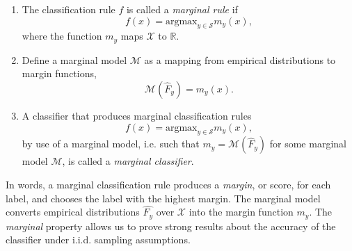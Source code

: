 \documentclass[12pt]{article}
\begin{document}
\begin{definition}
\begin{enumerate}
\item The classification rule $f$ is called a \emph{marginal rule} if 
\[
f(x) = \text{argmax}_{y \in \mathcal{S}} m_y(x),
\]
where the function $m_y$ maps $\mathcal{X}$ to $\mathbb{R}$. 
\item Define a marginal model $\mathcal{M}$ as a mapping from empirical distributions
to margin functions,
\[
\mathcal{M}(\hat{F}_y) = m_y(x).
\]
\item A classifier that produces marginal classification rules
\[
f(x) = \text{argmax}_{y \in \mathcal{S}} m_y(x),
\]
by use of a marginal model, i.e. such that
$m_y=\mathcal{M}(\hat{F}_y)$ for some marginal model $\mathcal{M}$,
is called a \emph{marginal classifier}.
\end{enumerate}
\end{definition}
In words, a marginal classification rule produces a \emph{margin}, or
score, for each label, and chooses the label with the highest
margin. The marginal model converts empirical distributions
$\hat{F_y}$ over $\mathcal{X}$ into the margin function
$m_y$.  The \emph{marginal} property allows us to prove strong results
about the accuracy of the classifier under i.i.d. sampling assumptions.

\end{document}
